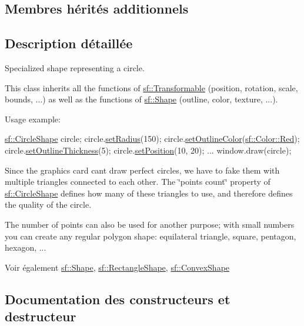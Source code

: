 \subsection*{Membres hérités additionnels}


\subsection{Description détaillée}
Specialized shape representing a circle. 

This class inherits all the functions of \hyperlink{classsf_1_1Transformable}{sf\+::\+Transformable} (position, rotation, scale, bounds, ...) as well as the functions of \hyperlink{classsf_1_1Shape}{sf\+::\+Shape} (outline, color, texture, ...).

Usage example\+: 
\begin{DoxyCode}
\hyperlink{classsf_1_1CircleShape}{sf::CircleShape} circle;
circle.\hyperlink{classsf_1_1CircleShape_a21cdf85fc2f201e10222a241af864be0}{setRadius}(150);
circle.\hyperlink{classsf_1_1Shape_a5978f41ee349ac3c52942996dcb184f7}{setOutlineColor}(\hyperlink{classsf_1_1Color_a127dbf55db9c07d0fa8f4bfcbb97594a}{sf::Color::Red});
circle.\hyperlink{classsf_1_1Shape_a5ad336ad74fc1f567fce3b7e44cf87dc}{setOutlineThickness}(5);
circle.\hyperlink{classsf_1_1Transformable_a4dbfb1a7c80688b0b4c477d706550208}{setPosition}(10, 20);
...
window.draw(circle);
\end{DoxyCode}


Since the graphics card can\textquotesingle{}t draw perfect circles, we have to fake them with multiple triangles connected to each other. The \char`\"{}points count\char`\"{} property of \hyperlink{classsf_1_1CircleShape}{sf\+::\+Circle\+Shape} defines how many of these triangles to use, and therefore defines the quality of the circle.

The number of points can also be used for another purpose; with small numbers you can create any regular polygon shape\+: equilateral triangle, square, pentagon, hexagon, ...

\begin{DoxySeeAlso}{Voir également}
\hyperlink{classsf_1_1Shape}{sf\+::\+Shape}, \hyperlink{classsf_1_1RectangleShape}{sf\+::\+Rectangle\+Shape}, \hyperlink{classsf_1_1ConvexShape}{sf\+::\+Convex\+Shape} 
\end{DoxySeeAlso}


\subsection{Documentation des constructeurs et destructeur}
\mbox{\label{classsf_1_1CircleShape_aaebe705e7180cd55588eb19488af3af1}} 
